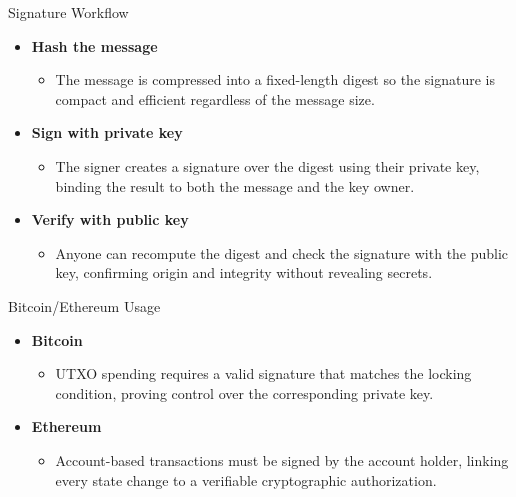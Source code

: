 \documentclass[aspectratio=169]{beamer}
\begin{document}
\begin{frame}{Signature Workflow}
  \begin{itemize}
    \item \textbf{Hash the message}
      \begin{itemize}
        \item The message is compressed into a fixed-length digest so the signature is compact and efficient regardless of the message size.
      \end{itemize}
    \item \textbf{Sign with private key}
      \begin{itemize}
        \item The signer creates a signature over the digest using their private key, binding the result to both the message and the key owner.
      \end{itemize}
    \item \textbf{Verify with public key}
      \begin{itemize}
        \item Anyone can recompute the digest and check the signature with the public key, confirming origin and integrity without revealing secrets.
      \end{itemize}
  \end{itemize}
\end{frame}

\begin{frame}{Bitcoin/Ethereum Usage}
  \begin{itemize}
    \item \textbf{Bitcoin}
      \begin{itemize}
        \item UTXO spending requires a valid signature that matches the locking condition, proving control over the corresponding private key.
      \end{itemize}
    \item \textbf{Ethereum}
      \begin{itemize}
        \item Account-based transactions must be signed by the account holder, linking every state change to a verifiable cryptographic authorization.
      \end{itemize}
  \end{itemize}
\end{frame}
\end{document}
